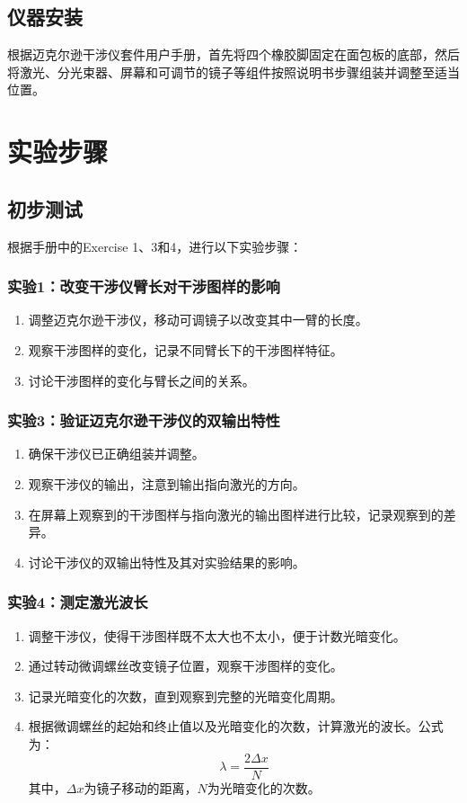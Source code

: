 \documentclass{ctexart}
\begin{document}
\subsection{仪器安装}
根据迈克尔逊干涉仪套件用户手册，首先将四个橡胶脚固定在面包板的底部，然后将激光、分光束器、屏幕和可调节的镜子等组件按照说明书步骤组装并调整至适当位置。

\section{实验步骤}
\subsection{初步测试}
根据手册中的Exercise 1、3和4，进行以下实验步骤：

\subsubsection{实验1：改变干涉仪臂长对干涉图样的影响}
\begin{enumerate}
    \item 调整迈克尔逊干涉仪，移动可调镜子以改变其中一臂的长度。
    \item 观察干涉图样的变化，记录不同臂长下的干涉图样特征。
    \item 讨论干涉图样的变化与臂长之间的关系。
\end{enumerate}

\subsubsection{实验3：验证迈克尔逊干涉仪的双输出特性}
\begin{enumerate}
    \item 确保干涉仪已正确组装并调整。
    \item 观察干涉仪的输出，注意到输出指向激光的方向。
    \item 在屏幕上观察到的干涉图样与指向激光的输出图样进行比较，记录观察到的差异。
    \item 讨论干涉仪的双输出特性及其对实验结果的影响。
\end{enumerate}

\subsubsection{实验4：测定激光波长}
\begin{enumerate}
    \item 调整干涉仪，使得干涉图样既不太大也不太小，便于计数光暗变化。
    \item 通过转动微调螺丝改变镜子位置，观察干涉图样的变化。
    \item 记录光暗变化的次数，直到观察到完整的光暗变化周期。
    \item 根据微调螺丝的起始和终止值以及光暗变化的次数，计算激光的波长。公式为：
    \[
    \lambda = \frac{2 \Delta x}{N}
    \]
    其中，\(\Delta x\)为镜子移动的距离，\(N\)为光暗变化的次数。
\end{enumerate}
\end{document}
